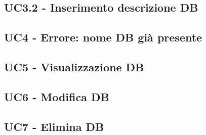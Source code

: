 \documentclass[5pt]{article}
\begin{document}
\subsection{UC3.2 - Inserimento descrizione DB}
\label{sec:UC3.2}

\subsection{UC4 - Errore: nome DB già presente}
\label{sec:UC4}

\subsection{UC5 - Visualizzazione DB}
\label{sec:UC5}

\subsection{UC6 - Modifica DB}
\label{sec:UC6}

\subsection{UC7 - Elimina DB}
\label{sec:UC7}
\end{document}
